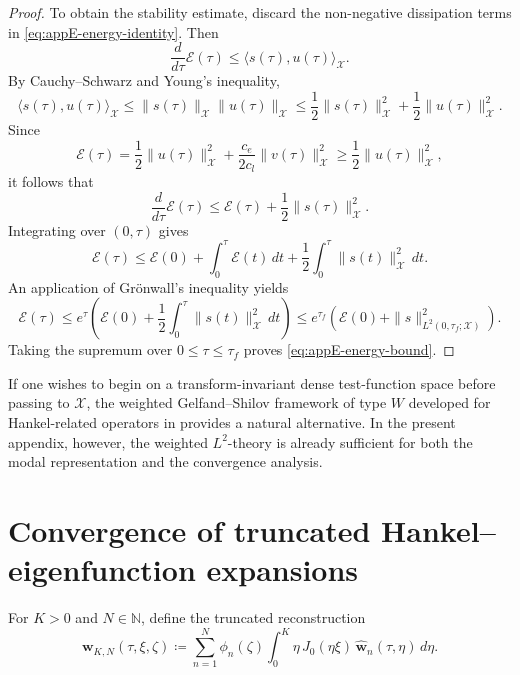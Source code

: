 \begin{proof}
    To obtain the stability estimate, discard the non-negative dissipation terms in
    \eqref{eq:appE-energy-identity}. Then
    \[
        \frac{d}{d\tau}\mathcal E(\tau)
        \le
        \langle s(\tau),u(\tau)\rangle_{\mathcal X}.
    \]
    By Cauchy--Schwarz and Young's inequality,
    \[
        \langle s(\tau),u(\tau)\rangle_{\mathcal X}
        \le
        \|s(\tau)\|_{\mathcal X}\|u(\tau)\|_{\mathcal X}
        \le
        \frac12\|s(\tau)\|_{\mathcal X}^2
        +
        \frac12\|u(\tau)\|_{\mathcal X}^2.
    \]
    Since
    \[
        \mathcal E(\tau)
        =
        \frac12\|u(\tau)\|_{\mathcal X}^2
        +
        \frac{c_e}{2c_l}\|v(\tau)\|_{\mathcal X}^2
        \ge
        \frac12\|u(\tau)\|_{\mathcal X}^2,
    \]
    it follows that
    \[
        \frac{d}{d\tau}\mathcal E(\tau)
        \le
        \mathcal E(\tau)
        +
        \frac12\|s(\tau)\|_{\mathcal X}^2.
    \]
    Integrating over \((0,\tau)\) gives
    \[
        \mathcal E(\tau)
        \le
        \mathcal E(0)
        +
        \int_0^\tau \mathcal E(t)\, dt
        +
        \frac12\int_0^\tau \|s(t)\|_{\mathcal X}^2\, dt.
    \]
    An application of Gr\"onwall's inequality yields
    \[
        \mathcal E(\tau)
        \le
        e^\tau
        \left(
        \mathcal E(0)
        +
        \frac12\int_0^\tau \|s(t)\|_{\mathcal X}^2\, dt
        \right)
        \le
        e^{\tau_f}
        \left(
        \mathcal E(0)
        +
        \|s\|_{L^2(0,\tau_f;\mathcal X)}^2
        \right).
    \]
    Taking the supremum over \(0\le \tau\le \tau_f\) proves
    \eqref{eq:appE-energy-bound}.
\end{proof}

\begin{remark}
    If one wishes to begin on a transform-invariant dense test-function space
    before passing to \(\mathcal{X}\), the weighted Gelfand--Shilov framework of type \(W\)
    developed for Hankel-related operators in \cite{Mahato_Pasawan_2021} provides
    a natural alternative. In the present appendix, however, the weighted
    \(L^2\)-theory is already sufficient for both the modal representation and the
    convergence analysis.
\end{remark}

\section{Convergence of truncated Hankel--eigenfunction expansions}
\label{sec:appE-convergence}

For \(K>0\) and \(N\in\mathbb{N}\), define the truncated reconstruction
\begin{equation}
    \mathbf{w}_{K,N}(\tau,\xi,\zeta)
    \coloneqq
    \sum_{n=1}^{N}
    \phi_n(\zeta)
    \int_0^{K}
    \eta\, J_0(\eta\xi)\,
    \widehat{\mathbf{w}}_n(\tau,\eta)\, d\eta.
    \label{eq:appE-truncated-reconstruction}
\end{equation}

